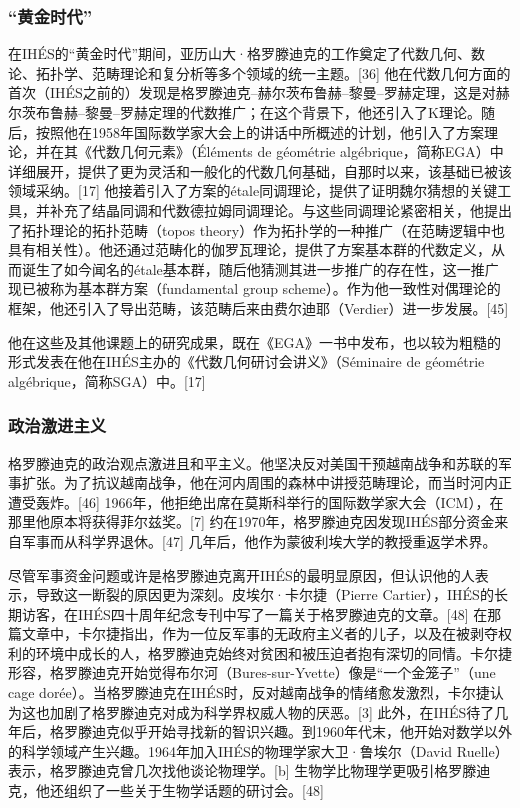 \subsubsection{“黄金时代”}  
在IHÉS的“黄金时代”期间，亚历山大·格罗滕迪克的工作奠定了代数几何、数论、拓扑学、范畴理论和复分析等多个领域的统一主题。[36] 他在代数几何方面的首次（IHÉS之前的）发现是格罗滕迪克–赫尔茨布鲁赫–黎曼–罗赫定理，这是对赫尔茨布鲁赫–黎曼–罗赫定理的代数推广；在这个背景下，他还引入了K理论。随后，按照他在1958年国际数学家大会上的讲话中所概述的计划，他引入了方案理论，并在其《代数几何元素》（Éléments de géométrie algébrique，简称EGA）中详细展开，提供了更为灵活和一般化的代数几何基础，自那时以来，该基础已被该领域采纳。[17] 他接着引入了方案的étale同调理论，提供了证明魏尔猜想的关键工具，并补充了结晶同调和代数德拉姆同调理论。与这些同调理论紧密相关，他提出了拓扑理论的拓扑范畴（topos theory）作为拓扑学的一种推广（在范畴逻辑中也具有相关性）。他还通过范畴化的伽罗瓦理论，提供了方案基本群的代数定义，从而诞生了如今闻名的étale基本群，随后他猜测其进一步推广的存在性，这一推广现已被称为基本群方案（fundamental group scheme）。作为他一致性对偶理论的框架，他还引入了导出范畴，该范畴后来由费尔迪耶（Verdier）进一步发展。[45]

他在这些及其他课题上的研究成果，既在《EGA》一书中发布，也以较为粗糙的形式发表在他在IHÉS主办的《代数几何研讨会讲义》（Séminaire de géométrie algébrique，简称SGA）中。[17]
\subsubsection{政治激进主义}  
格罗滕迪克的政治观点激进且和平主义。他坚决反对美国干预越南战争和苏联的军事扩张。为了抗议越南战争，他在河内周围的森林中讲授范畴理论，而当时河内正遭受轰炸。[46] 1966年，他拒绝出席在莫斯科举行的国际数学家大会（ICM），在那里他原本将获得菲尔兹奖。[7] 约在1970年，格罗滕迪克因发现IHÉS部分资金来自军事而从科学界退休。[47] 几年后，他作为蒙彼利埃大学的教授重返学术界。

尽管军事资金问题或许是格罗滕迪克离开IHÉS的最明显原因，但认识他的人表示，导致这一断裂的原因更为深刻。皮埃尔·卡尔捷（Pierre Cartier），IHÉS的长期访客，在IHÉS四十周年纪念专刊中写了一篇关于格罗滕迪克的文章。[48] 在那篇文章中，卡尔捷指出，作为一位反军事的无政府主义者的儿子，以及在被剥夺权利的环境中成长的人，格罗滕迪克始终对贫困和被压迫者抱有深切的同情。卡尔捷形容，格罗滕迪克开始觉得布尔河（Bures-sur-Yvette）像是“一个金笼子”（une cage dorée）。当格罗滕迪克在IHÉS时，反对越南战争的情绪愈发激烈，卡尔捷认为这也加剧了格罗滕迪克对成为科学界权威人物的厌恶。[3] 此外，在IHÉS待了几年后，格罗滕迪克似乎开始寻找新的智识兴趣。到1960年代末，他开始对数学以外的科学领域产生兴趣。1964年加入IHÉS的物理学家大卫·鲁埃尔（David Ruelle）表示，格罗滕迪克曾几次找他谈论物理学。[b] 生物学比物理学更吸引格罗滕迪克，他还组织了一些关于生物学话题的研讨会。[48]


